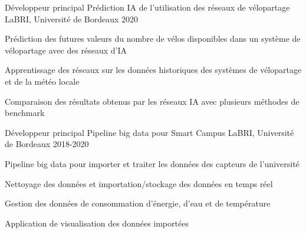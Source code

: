 
\begin{cventries}
	\cventry
	{Développeur principal}
	{Prédiction IA de l'utilisation des réseaux de vélopartage}
	{LaBRI, Université de Bordeaux}
	{2020}
	{
		\begin{cvitems}
			\item {Prédiction des futures valeurs du nombre de vélos disponibles dans un système de vélopartage avec des réseaux d'IA}
			\item {Apprentissage des réseaux sur les données historiques des systèmes de vélopartage et de la météo locale}
			\item {Comparaison des résultats obtenus par les réseaux IA avec plusieurs méthodes de benchmark}
		\end{cvitems}
	}
	
	\cventry
	{Développeur principal}
	{Pipeline big data pour Smart Campus}
	{LaBRI, Université de Bordeaux}
	{2018-2020}
	{
		\begin{cvitems}
			\item {Pipeline big data pour importer et traiter les données des capteurs de l'université}
			\item {Nettoyage des données et importation/stockage des données en temps réel}
			\item {Gestion des données de consommation d'énergie, d'eau et de température}
			\item {Application de visualisation des données importées}
		\end{cvitems}
	}
\end{cventries}
